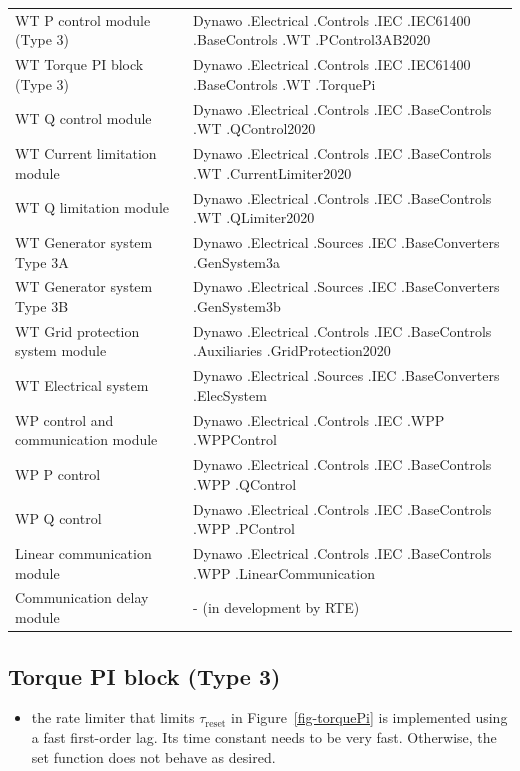 \documentclass[
  a4paper,
  DIV=11,
  numbers=noendperiod]{scrartcl}
\providecommand{\tightlist}{%
  \setlength{\itemsep}{0pt}\setlength{\parskip}{0pt}}\usepackage{longtable,booktabs,array}
\begin{document}
\begin{longtable}[]{@{}
  >{\raggedright\arraybackslash}p{}
  >{\raggedright\arraybackslash}p{}@{}}
WT P control module (Type 3) & Dynawo .Electrical .Controls .IEC
.IEC61400 .BaseControls .WT .PControl3AB2020 \\
WT Torque PI block (Type 3) & Dynawo .Electrical .Controls .IEC
.IEC61400 .BaseControls .WT .TorquePi \\
WT Q control module & Dynawo .Electrical .Controls .IEC .BaseControls
.WT .QControl2020 \\
WT Current limitation module & Dynawo .Electrical .Controls .IEC
.BaseControls .WT .CurrentLimiter2020 \\
WT Q limitation module & Dynawo .Electrical .Controls .IEC .BaseControls
.WT .QLimiter2020 \\
WT Generator system Type 3A & Dynawo .Electrical .Sources .IEC
.BaseConverters .GenSystem3a \\
WT Generator system Type 3B & Dynawo .Electrical .Sources .IEC
.BaseConverters .GenSystem3b \\
WT Grid protection system module & Dynawo .Electrical .Controls .IEC
.BaseControls .Auxiliaries .GridProtection2020 \\
WT Electrical system & Dynawo .Electrical .Sources .IEC .BaseConverters
.ElecSystem \\
WP control and communication module & Dynawo .Electrical .Controls .IEC
.WPP .WPPControl \\
WP P control & Dynawo .Electrical .Controls .IEC .BaseControls .WPP
.QControl \\
WP Q control & Dynawo .Electrical .Controls .IEC .BaseControls .WPP
.PControl \\
Linear communication module & Dynawo .Electrical .Controls .IEC
.BaseControls .WPP .LinearCommunication \\
Communication delay module & - (in development by RTE) \\
\end{longtable}

\subsection{Torque PI block (Type 3)}\label{torque-pi-block-type-3}

\begin{itemize}
\tightlist
\item
  the rate limiter that limits \(\tau_\mathrm{reset}\) in
  Figure~\ref{fig-torquePi} is implemented using a fast first-order lag.
  Its time constant needs to be very fast. Otherwise, the set function
  does not behave as desired.
\end{itemize}
\end{document}
